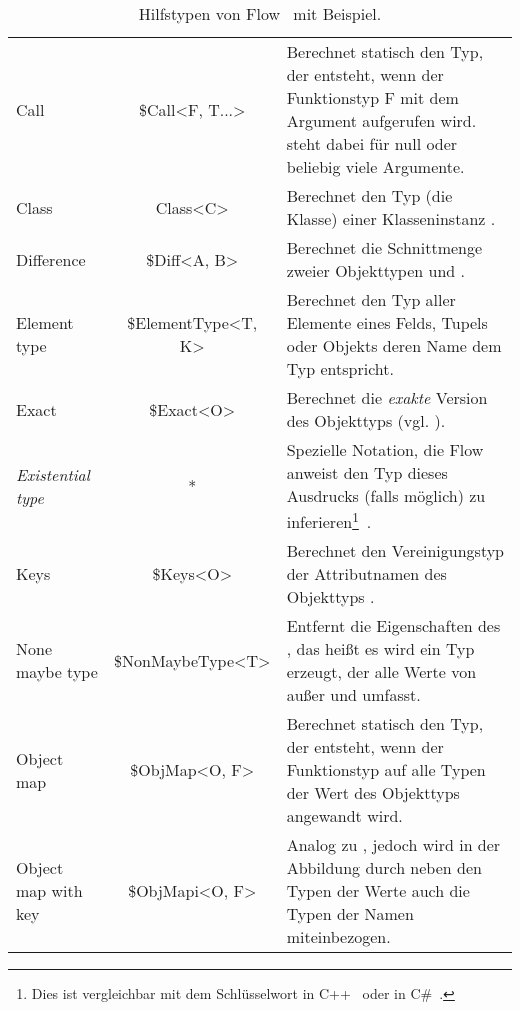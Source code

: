 \begin{longtabuenv}
\begin{longtabu} to 
  \midrule
   &  &  \\
  \midrule
\endhead
  \midrule
  \caption{Hilfstypen von Flow~\autocite{FLOW:UTILITY_TYPES} mit Beispiel.}
\endfoot
  Call                      & \$Call<F, T...>        & Berechnet statisch den Typ, der entsteht, wenn der Funktionstyp F mit dem Argument  aufgerufen wird.  steht dabei für null oder beliebig viele Argumente.  \medskip\\
  Class                     & Class<C>               & Berechnet den Typ (die Klasse) einer Klasseninstanz . \medskip\\
  Difference                & \$Diff<A, B>           & Berechnet die Schnittmenge zweier Objekttypen  und . \medskip\\
  Element type              & \$ElementType<T, K>    & Berechnet den Typ aller Elemente eines Felds, Tupels oder Objekts deren Name dem Typ  entspricht. \medskip\\
  Exact                     & \$Exact<O>             & Berechnet die \textit{exakte} Version des Objekttyps \newline(vgl. ). \medskip\\
  \textit{Existential type} & *                      & Spezielle Notation, die Flow anweist den Typ dieses Ausdrucks (falls möglich) zu inferieren\footnote{Dies ist vergleichbar mit dem Schlüsselwort  in C++~\autocite[151]{CPP11_SPEC} oder  in C\#~\autocite{CSHARP:VAR}.}~\autocite{FLOW:EXISTENTIAL_TYPES}. \medskip\\
  Keys                      & \$Keys<O>              & Berechnet den Vereinigungstyp der Attributnamen des Objekttyps . \medskip\\
  None maybe type           & \$NonMaybeType<T>      & Entfernt die Eigenschaften des , das heißt es wird ein Typ erzeugt, der alle Werte von  außer  und  umfasst. \medskip\\
  Object map                & \$ObjMap<O, F>         & Berechnet statisch den Typ, der entsteht, wenn der Funktionstyp  auf alle Typen der Wert des Objekttyps  angewandt wird. \medskip\\
  Object map with key       & \$ObjMapi<O, F>        & Analog zu , jedoch wird in der Abbildung durch  neben den Typen der Werte auch die Typen der Namen miteinbezogen. \medskip\\

\end{longtabu}
\end{longtabuenv}

